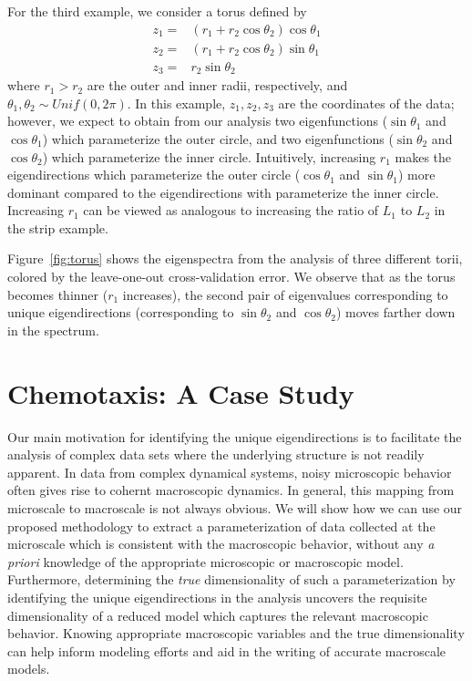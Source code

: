 \documentclass[preprint]{elsarticle}
\begin{document}
For the third example, we consider a torus defined by
%
\begin{equation}
\begin{aligned}
z_1 =& (r_1 + r_2 \cos \theta_2 ) \cos \theta_1 \\
z_2 =& (r_1 + r_2 \cos \theta_2 ) \sin \theta_1 \\
z_3 =& r_2 \sin \theta_2
\end{aligned}
\end{equation}
%
where $r_1 > r_2$ are the outer and inner radii, respectively, and $\theta_1, \theta_2 \sim Unif(0, 2 \pi)$. 
%
In this example, $z_1, z_2, z_3$ are the coordinates of the data; however, we expect to obtain from our analysis two eigenfunctions ($\sin \theta_1$ and $\cos \theta_1$) which parameterize the outer circle, and two eigenfunctions ($\sin \theta_2$ and $\cos \theta_2$) which parameterize the inner circle. 
%
Intuitively, increasing $r_1$ makes the eigendirections which parameterize the outer circle ($\cos \theta_1$ and $\sin \theta_1$) more dominant compared to the eigendirections with parameterize the inner circle.
%
Increasing $r_1$ can be viewed as analogous to increasing the ratio of $L_1$ to $L_2$ in the strip example. 

Figure~\ref{fig:torus} shows the eigenspectra from the analysis of three different torii, colored by the leave-one-out cross-validation error. 
%
We observe that as the torus becomes thinner ($r_1$ increases), the second pair of eigenvalues corresponding to unique eigendirections (corresponding to $\sin \theta_2$ and $\cos \theta_2$) moves farther down in the spectrum. 

\section{Chemotaxis: A Case Study}

Our main motivation for identifying the unique eigendirections is to facilitate the analysis of complex data sets where the underlying structure is not readily apparent. 
%
In data from complex dynamical systems, noisy microscopic behavior often gives rise to cohernt macroscopic dynamics. 
%
%
In general, this mapping from microscale to macroscale is not always obvious.
%
We will show how we can use our proposed methodology to extract a parameterization of data collected at the microscale which is consistent with the macroscopic behavior, without any {\em a priori} knowledge of the appropriate microscopic or macroscopic model.
%
Furthermore, determining the {\em true} dimensionality of such a parameterization by identifying the unique eigendirections in the analysis uncovers the requisite dimensionality of a reduced model which captures the relevant macroscopic behavior. 
%
Knowing appropriate macroscopic variables and the true dimensionality can help inform modeling efforts and aid in the writing of accurate macroscale models.
\end{document}

